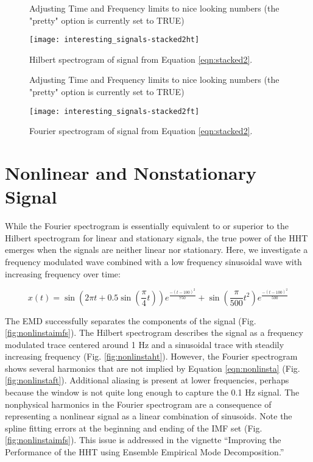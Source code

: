 \documentclass[12pt]{article}
\begin{document}
\begin{figure}[ht]
\begin{center}
\begin{Schunk}
\begin{Soutput}
Adjusting Time and Frequency limits to nice looking numbers (the "pretty" option is currently set to TRUE)
\end{Soutput}
\end{Schunk}
\texttt{[image: interesting\_signals-stacked2ht]}
\end{center}
\caption{Hilbert spectrogram of signal from Equation \ref{eqn:stacked2}.}
\label{fig:stacked2ht}
\end{figure}

\begin{figure}[ht]
\begin{center}
\begin{Schunk}
\begin{Soutput}
Adjusting Time and Frequency limits to nice looking numbers (the "pretty" option is currently set to TRUE)
\end{Soutput}
\end{Schunk}
\texttt{[image: interesting\_signals-stacked2ft]}
\end{center}
\caption{Fourier spectrogram of signal from Equation \ref{eqn:stacked2}.}
\label{fig:stacked2ft}
\end{figure}

\FloatBarrier

\section{Nonlinear and Nonstationary Signal}
While the Fourier spectrogram is essentially equivalent to or superior to the Hilbert spectrogram for linear and stationary signals,
the true power of the HHT emerges when the signals are neither linear nor stationary.
Here, we investigate a frequency modulated wave combined with a low frequency sinusoidal wave with increasing frequency over time:

\begin{equation}
\label{eqn:nonlinsta}
x (t) = \sin(2\pi t+0.5\sin(\frac{\pi}{4} t))e^{\frac{-(t-100)^{2}}{750}} + \sin(\frac{\pi}{500} t^{2})e^{\frac{-(t-100)^{2}}{500}}
\end{equation}

The EMD successfully separates the components of the signal (Fig. \ref{fig:nonlinstaimfs}).
The Hilbert spectrogram describes the signal as a frequency modulated trace centered around 1 Hz and a 
sinusoidal trace with steadily increasing frequency (Fig. \ref{fig:nonlinstaht}).
However, the Fourier spectrogram shows several harmonics that are not implied by Equation \ref{eqn:nonlinsta} (Fig. \ref{fig:nonlinstaft}).
Additional aliasing is present at lower frequencies, perhaps because the window is not quite long enough to capture the 0.1 Hz signal.
The nonphysical harmonics in the Fourier spectrogram are a consequence of representing a nonlinear signal as a linear combination of sinusoids.
Note the spline fitting errors at the beginning and ending of the IMF set (Fig. \ref{fig:nonlinstaimfs}).
This issue is addressed in the vignette ``Improving the Performance of the HHT using Ensemble Empirical Mode Decomposition.''
\end{document}
